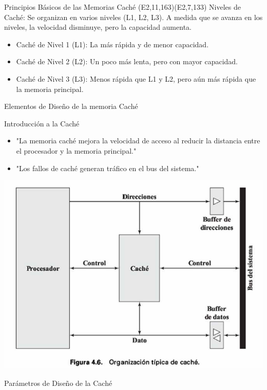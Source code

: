 \documentclass[presentation]{beamer}
\begin{document}
\begin{frame}[label={sec:orge6152e4}]{Principios Básicos de las Memorias Caché (E2,11,163)(E2,7,133)}
Niveles de Caché: Se organizan en varios niveles (L1, L2, L3). A medida que se avanza en los niveles, la velocidad disminuye, pero la capacidad aumenta.

\begin{itemize}
\item Caché de Nivel 1 (L1): La más rápida y de menor capacidad.
\item Caché de Nivel 2 (L2): Un poco más lenta, pero con mayor capacidad.
\item Caché de Nivel 3 (L3): Menos rápida que L1 y L2, pero aún más rápida que la memoria principal.
\end{itemize}


\begin{block}{Elementos de Diseño de la memoria Caché}
\end{block}
\begin{block}{Introducción a la Caché}
\begin{itemize}
\item "La memoria caché mejora la velocidad de acceso
al reducir la distancia entre el procesador y la memoria principal."
\item "Los fallos de caché generan tráfico en el bus del sistema."
\end{itemize}
\begin{center}
\includegraphics[width=.9\linewidth]{./Imagenes/fig4.6.png}
\end{center}
\end{block}
\begin{block}{Parámetros de Diseño de la Caché}
\begin{itemize}

\end{itemize}
\end{block}
\end{frame}
\end{document}
